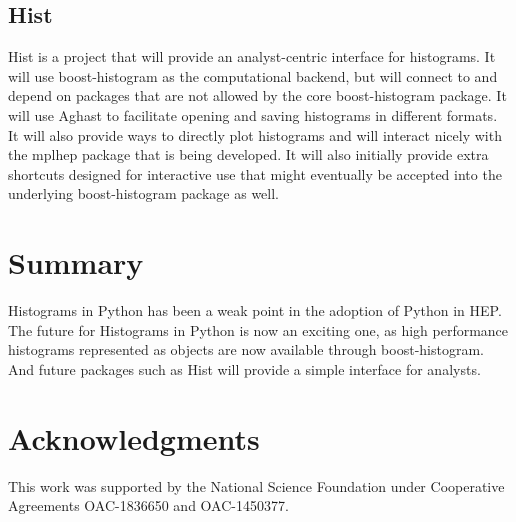 \documentclass{webofc}
\begin{document}
\subsection{Hist}
\label{sec-hist}

Hist is a project that will provide an analyst-centric interface for histograms. It will use boost-histogram as the computational backend, but will connect to and depend on packages that are not allowed by the core boost-histogram package. It will use Aghast to facilitate opening and saving histograms in different formats. It will also provide ways to directly plot histograms and will interact nicely with the mplhep package that is being developed. It will also initially provide extra shortcuts designed for interactive use that might eventually be accepted into the underlying boost-histogram package as well.


\section{Summary}
\label{sec-4}


Histograms in Python has been a weak point in the adoption of Python in HEP. The future for Histograms in Python is now an exciting one, as high performance histograms represented as objects are now available through boost-histogram. And future packages such as Hist will provide a simple interface for analysts.

\section*{Acknowledgments}

This work was supported by the National Science Foundation under Cooperative Agreements OAC-1836650 and OAC-1450377.


\end{document}
